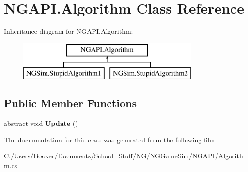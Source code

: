 \hypertarget{class_n_g_a_p_i_1_1_algorithm}{}\section{N\+G\+A\+P\+I.\+Algorithm Class Reference}
\label{class_n_g_a_p_i_1_1_algorithm}
Inheritance diagram for N\+G\+A\+P\+I.\+Algorithm\+:\begin{figure}[H]
\begin{center}
\leavevmode
\includegraphics[height=2.000000cm]{class_n_g_a_p_i_1_1_algorithm}
\end{center}
\end{figure}
\subsection*{Public Member Functions}
\begin{DoxyCompactItemize}
\item 
\mbox{\label{class_n_g_a_p_i_1_1_algorithm_a295ea01269741f9de4b68e4813c1f1f2}} 
abstract void {\bfseries Update} ()
\end{DoxyCompactItemize}


The documentation for this class was generated from the following file\+:\begin{DoxyCompactItemize}
\item 
C\+:/\+Users/\+Booker/\+Documents/\+School\+\_\+\+Stuff/\+N\+G/\+N\+G\+Game\+Sim/\+N\+G\+A\+P\+I/Algorithm.\+cs\end{DoxyCompactItemize}
